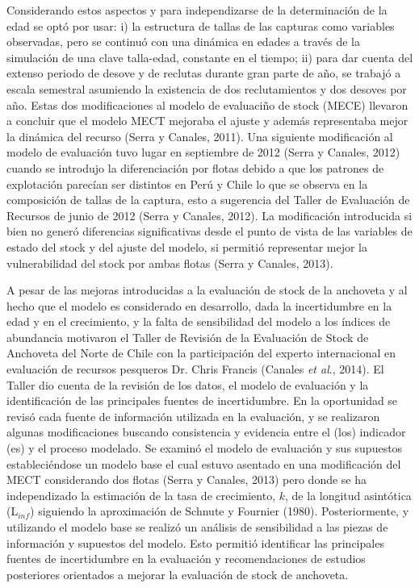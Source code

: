\documentclass[letter,11pt]{article}
\begin{document}
Considerando estos aspectos y para independizarse de la determinaci\'on de
la edad se opt\'o por usar: i) la estructura de tallas de las capturas
como variables observadas, pero se continu\'o con una din\'amica en edades a
trav\'es de la simulaci\'on de una clave talla-edad, constante en el tiempo;
ii) para dar cuenta del extenso periodo de desove y de reclutas durante
gran parte de a\~{n}o, se trabaj\'o a escala semestral asumiendo la existencia
de dos reclutamientos y dos desoves por a\~{n}o. Estas dos modificaciones al
modelo de evaluaci\~{n}o de stock (MECE) llevaron a concluir que el modelo
MECT mejoraba el ajuste y adem\'as representaba mejor la din\'amica del
recurso (Serra y Canales, 2011). Una siguiente modificaci\'on al modelo de
evaluaci\'on tuvo lugar en septiembre de 2012 (Serra y Canales, 2012)
cuando se introdujo la diferenciaci\'on por flotas debido a que los
patrones de explotaci\'on parec\'ian ser distintos en Per\'u y Chile lo que se
observa en la composici\'on de tallas de la captura, esto a sugerencia del
Taller de Evaluaci\'on de Recursos de junio de 2012 (Serra y Canales,
2012). La modificaci\'on introducida si bien no gener\'o diferencias
significativas desde el punto de vista de las variables de estado del
stock y del ajuste del modelo, si permiti\'o representar mejor la
vulnerabilidad del stock por ambas flotas (Serra y Canales, 2013).

A pesar de las mejoras introducidas a la evaluaci\'on de stock de la
anchoveta y al hecho que el modelo es considerado en desarrollo, dada la
incertidumbre en la edad y en el crecimiento, y la falta de sensibilidad
del modelo a los \'indices de abundancia motivaron el Taller de Revisi\'on
de la Evaluaci\'on de Stock de Anchoveta del Norte de Chile con la
participaci\'on del experto internacional en evaluaci\'on de recursos
pesqueros Dr. Chris Francis (Canales \textit{et al}., 2014). El Taller
dio cuenta de la revisi\'on de los datos, el modelo de evaluaci\'on y la
identificaci\'on de las principales fuentes de incertidumbre. En la
oportunidad se revis\'o cada fuente de informaci\'on utilizada en la
evaluaci\'on, y se realizaron algunas modificaciones buscando consistencia
y evidencia entre el (los) indicador (es) y el proceso modelado. Se
examin\'o el modelo de evaluaci\'on y sus supuestos estableci\'endose un
modelo base el cual estuvo asentado en una modificaci\'on del MECT
considerando dos flotas (Serra y Canales, 2013) pero donde se ha
independizado la estimaci\'on de la tasa de crecimiento, $k$, de la longitud
asint\'otica (L$_{inf}$) siguiendo la aproximaci\'on de Schnute y Fournier
(1980). Posteriormente, y utilizando el modelo base se realiz\'o un
an\'alisis de sensibilidad a las piezas de informaci\'on y supuestos del
modelo. Esto permiti\'o identificar las principales fuentes de
incertidumbre en la evaluaci\'on y recomendaciones de estudios posteriores
orientados a mejorar la evaluaci\'on de stock de anchoveta.
\end{document}
